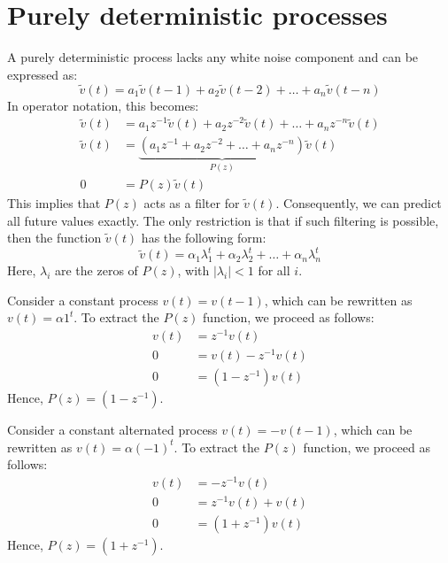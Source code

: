 \section{Purely deterministic processes}

A purely deterministic process lacks any white noise component and can be expressed as:
\[\tilde{v}(t)=a_1\tilde{v}(t-1)+a_2\tilde{v}(t-2)+\dots+a_n\tilde{v}(t-n)\]
In operator notation, this becomes:
\begin{align*}
    \tilde{v}(t)    &= a_1z^{-1}\tilde{v}(t)+a_2z^{-2}\tilde{v}(t)+\dots+a_nz^{-n}\tilde{v}(t) \\
    \tilde{v}(t)    &= \underbrace{\left(a_1z^{-1}+a_2z^{-2}+\dots+a_nz^{-n}\right)}_{P(z)} \tilde{v}(t) \\
    0               &= P(z)\tilde{v}(t)
\end{align*}
This implies that $P(z)$ acts as a filter for $\tilde{v}(t)$. 
Consequently, we can predict all future values exactly.
The only restriction is that if such filtering is possible, then the function $\tilde{v}(t)$ has the following form:
\[\tilde{v}(t)=\alpha_1\lambda_1^t+\alpha_2\lambda_2^t+\dots+\alpha_n\lambda_n^t\]
Here, $\lambda_i$ are the zeros of $P(z)$, with $\left\lvert \lambda_i\right\rvert < 1$ for all $i$.
\begin{example}
    Consider a constant process $v(t)=v(t-1)$, which can be rewritten as $v(t)=\alpha 1^t$. 
    To extract the $P(z)$ function, we proceed as follows:
    \begin{align*}
        v(t)    &=z^{-1}v(t) \\
        0       &=v(t) - z^{-1}v(t) \\
        0       &=\left(1-z^{-1}\right)v(t)
    \end{align*}
    Hence, $P(z)=\left(1-z^{-1}\right)$. 
\end{example}
\begin{example}
    Consider a constant alternated process $v(t)=-v(t-1)$, which can be rewritten as $v(t)=\alpha (-1)^t$. 
    To extract the $P(z)$ function, we proceed as follows:
    \begin{align*}
        v(t)    &=-z^{-1}v(t) \\
        0       &=z^{-1}v(t) + v(t) \\
        0       &=\left(1+z^{-1}\right)v(t)
    \end{align*}
    Hence, $P(z)=\left(1+z^{-1}\right)$. 
\end{example}
